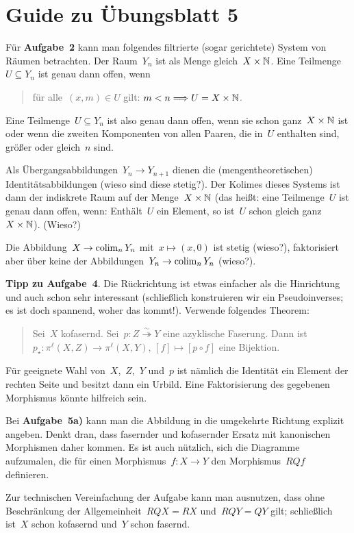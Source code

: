 \documentclass{uebblatt}
\begin{document}
\section*{Guide zu Übungsblatt 5}

Für \textbf{Aufgabe~2} kann man folgendes filtrierte (sogar gerichtete) System
von Räumen betrachten. Der Raum~$Y_n$ ist als Menge gleich~$X \times \mathbb{N}$. Eine
Teilmenge~$U \subseteq Y_n$ ist genau dann offen, wenn
\begin{quote}
für alle~$(x,m) \in U$ gilt: $m < n \Longrightarrow U = X \times \mathbb{N}$.
\end{quote}
Eine Teilmenge~$U \subseteq Y_n$ ist also genau dann offen, wenn sie schon
ganz~$X \times \mathbb{N}$ ist oder wenn die zweiten Komponenten von allen Paaren,
die in~$U$ enthalten sind, größer oder gleich~$n$ sind.

Als Übergangsabbildungen~$Y_n \to Y_{n+1}$ dienen die (mengentheoretischen)
Iden\-ti\-täts\-ab\-bil\-dun\-gen (wieso sind diese stetig?). Der Kolimes dieses Systems
ist dann der indiskrete Raum auf der Menge~$X \times \mathbb{N}$ (das heißt: eine
Teilmenge~$U$ ist genau dann offen, wenn: Enthält~$U$ ein Element, so ist~$U$
schon gleich ganz~$X \times \mathbb{N}$). (Wieso?)

Die Abbildung~$X \to \operatorname*{colim}_n Y_n$ mit~$x \mapsto (x,0)$ ist stetig (wieso?),
faktorisiert aber über keine der Abbildungen~$Y_n \to \operatorname*{colim}_n Y_n$ (wieso?).

\textbf{Tipp zu Aufgabe~4}. Die Rückrichtung ist etwas einfacher als die
Hinrichtung und auch schon sehr interessant (schließlich konstruieren wir ein
Pseudoinverses; es ist doch spannend, woher das kommt!). Verwende folgendes
Theorem:
\begin{quote}Sei~$X$ kofasernd. Sei~$p : Z \stackrel{\sim}{\twoheadrightarrow} Y$
eine azyklische Faserung. Dann ist~$p_\star : \pi^\ell(X,Z) \to
\pi^\ell(X,Y),\,[f] \mapsto [p \circ f]$ eine Bijektion.
\end{quote}
Für geeignete Wahl von~$X$,~$Z$,~$Y$ und~$p$ ist nämlich die Identität ein
Element der rechten Seite und besitzt dann ein Urbild. Eine Faktorisierung des
gegebenen Morphismus könnte hilfreich sein.

Bei \textbf{Aufgabe~5a)} kann man die Abbildung in die umgekehrte Richtung
explizit angeben. Denkt dran, dass fasernder und kofasernder Ersatz mit
kanonischen Morphismen daher kommen. Es ist auch nützlich, sich die Diagramme
aufzumalen, die für einen Morphismus~$f : X \to Y$ den Morphismus~$RQf$
definieren.

Zur technischen Vereinfachung der Aufgabe kann man ausnutzen, dass ohne
Beschränkung der Allgemeinheit~$RQX = RX$ und~$RQY = QY$ gilt; schließlich ist~$X$
schon kofasernd und~$Y$ schon fasernd.
\end{document}
